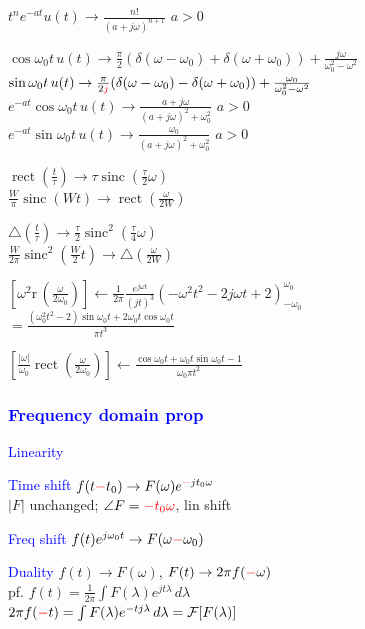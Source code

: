 \documentclass[4pt]{article}
\theoremstyle{definition}
\theoremstyle{definition}
\renewcommand{\r}{\mathrm{r}\,}             %
\renewcommand{\o}{\omega}
\newcommand{\ra}{\rightarrow}
\DeclareMathOperator{\rect}{rect}
\DeclareMathOperator{\sinc}{sinc}
\newcommand{\red}[1]{\textcolor{red}{#1}}
\newcommand{\blue}[1]{\textcolor{blue}{#1}}
\begin{document}
\begin{landscape}
\begin{multicols}{3}
    \(t^n e^{-at} u(t)\ra \frac{n!}{(a+j\o)^{n+1}}\)                    \hfill $a > 0$
\columnbreak

    \(\cos \o_0 t\, u(t)\ra \frac{\pi}{2}(\delta(\o - \o_0) + \delta(\o + \o_0)) + \frac{j\o}{\o_0^2-\o^2}\)\\       
    \(\sin \o_0 t\, u(t)\ra \frac{\pi}{2\red{j}}(\delta(\o - \o_0) - \delta(\o + \o_0)) + \frac{\o_0}{\o_0^2-\o^2}\)\\
    \(e^{-at}\cos \o_0t\, u(t)\ra \frac{a+j\o}{(a+j\o)^2 + \o_0^2}\)    \hfill $a > 0$\\
    \(e^{-at}\sin \o_0t\, u(t)\ra \frac{\o_0}{(a+j\o)^2 + \o_0^2}\)     \hfill $a > 0$         


    $\rect(\frac t {\tau}) \ra \tau \sinc(\frac{\tau}{2}\omega)$\\ 
    $\frac W \pi \sinc(Wt) \ra \rect(\frac{\omega}{2W})$

    \(\triangle (\frac t {\tau}) \ra \frac{\tau}{2} \sinc^2 (\frac{\tau}{4}\omega)\)\\
    \(\frac{W}{2\pi} \sinc^2 (\frac{W}{2}t) \ra \triangle(\frac{\omega}{2W})\)

    \([\o^2 \r(\frac{\o}{2\o_0})] \leftarrow \frac{1}{2\pi} \frac{e^{j\o t}}{(jt)^3}(-\o^2t^2-2j\o t + 2)^{\o_0}_{-\o_0}\)\\
    \(=\frac{(\o_0^2 t^2 - 2)\sin \o_0 t + 2\o_0 t\cos \o_0 t}{\pi t^3}\)\

    \([\frac{|\o|}{\o_0} \rect(\frac{\o}{2\o_0})] \leftarrow \frac{\cos \o_0 t + \o_0 t \sin \o_0 t - 1}{\o_0 \pi t^2}\)
\subsubsection*{\blue{Frequency domain prop}}
    \blue{Linearity}

    \blue{Time shift} \(f(t \red{-} t_0) \ra F(\omega) e^{\red{-} jt_0\omega}\) \\ 
        \hspace{1em} $|F|$ unchanged; $\angle F = \red{- t_0\omega}$, lin shift

    \blue{Freq shift} \(f(t) e^{j\omega_0 t} \ra F(\omega \red{-} \omega_0)\) 

    \blue{Duality} \(f(t) \ra F(\omega)\), \(F(t) \ra 2\pi f(\red{-} \omega)\)\\ 
        \hspace{1em} pf. \(f(t) = \frac 1 {2\pi} \int F(\lambda) e^{jt\lambda}\, d\lambda\)\\
            \hspace{2em} \(2\pi f(\red{-} t) = \int F(\lambda) e^{-tj\lambda}\, d\lambda = \mathcal{F}[F(\lambda)]\)


\end{multicols}
\end{landscape}
\end{document}
